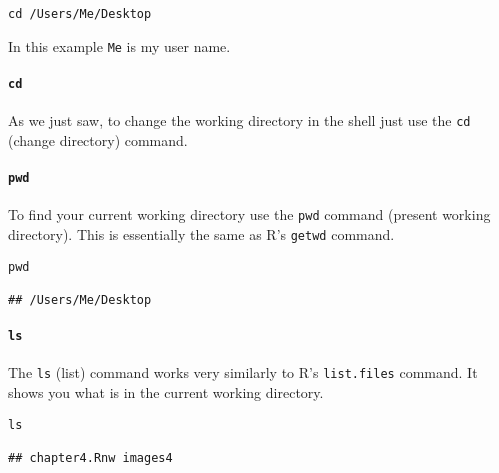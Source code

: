 \begin{knitrout}
\color{fgcolor}\begin{kframe}
\begin{verbatim}
cd /Users/Me/Desktop
\end{verbatim}
\end{kframe}
\end{knitrout}


\noindent In this example \texttt{Me} is my user name. 

\paragraph{{\tt{cd}}}

As we just saw, to change the working directory in the shell just use the {\tt{cd}} (change directory) command.

\paragraph{{\tt{pwd}}}

To find your current working directory use the \texttt{pwd} command (present working directory). This is essentially the same as R's \texttt{getwd} command.

\begin{knitrout}
\color{fgcolor}\begin{kframe}
\begin{verbatim}
pwd

## /Users/Me/Desktop
\end{verbatim}
\end{kframe}
\end{knitrout}


\paragraph{{\tt{ls}}}

The \texttt{ls} (list) command works very similarly to R's \texttt{list.files} command. It shows you what is in the current working directory.

\begin{knitrout}
\color{fgcolor}\begin{kframe}
\begin{verbatim}
ls

## chapter4.Rnw images4
\end{verbatim}
\end{kframe}
\end{knitrout}


